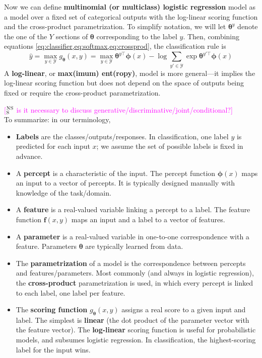 \documentclass[11pt,letterpaper]{article}
\newcommand{\ensuretext}[1]{#1}
\newcommand{\nssmarker}{\ensuretext{\textcolor{magenta}{\ensuremath{^{\textsc{NS}}_{\textsc{S}}}}}}
\newcommand{\arkcomment}[3]{\ensuretext{\textcolor{#3}{[#1 #2]}}}
\newcommand{\nss}[1]{\arkcomment{\nssmarker}{#1}{magenta}}
\newcommand{\params}{\mathbf{\theta}}
\begin{document}
Now we can define {\bf multinomial (or multiclass) logistic regression} model 
as a model over a fixed set of categorical outputs with the log-linear scoring function and the cross-product parametrization.
To simplify notation, we will let $\boldsymbol{\theta}^y$ denote the one of the $Y$ sections of $\boldsymbol{\theta}$ 
corresponding to the label $y$. 
Then, combining equations \cref{eq:classifier,eq:softmax,eq:crossprod}, 
the classification rule is
\begin{equation}\label{eq:logistic}
\hat{y} = \max_{y\in\mathcal{Y}} g_\params(x,y) = \max_{y\in\mathcal{Y}} \boldsymbol{\theta}^{y\top} \boldsymbol{\phi}(x) - \log{\sum_{y'\in\mathcal{Y}}{\exp{\boldsymbol{\theta}^{y'\top} \boldsymbol{\phi}(x)}}}
\end{equation} 
A {\bf log-linear}, or {\bf max(imum) ent(ropy)}, model is more general---it implies the log-linear scoring function 
but does not depend on the space of outputs being fixed or require the cross-product parametrization.

\nss{is it necessary to discuss generative/discriminative/joint/conditional?}
\\

\noindent To summarize: in our terminology,
\begin{itemize}
  \item {\bf Labels} are the classes/outputs/responses. In classification, one label $y$ is predicted for each input $x$; 
  we assume the set of possible labels is fixed in advance.
  \item A {\bf percept} is a characteristic of the input. The percept function $\boldsymbol{\phi}(x)$ maps an input to a vector of percepts.
  It is typically designed manually with knowledge of the task/domain.
  \item A {\bf feature} is a real-valued variable linking a percept to a label. The feature function $\mathbf{f}(x,y)$ maps an input and a label to a vector of features.
  \item A {\bf parameter} is a real-valued variable in one-to-one correspondence with a feature. Parameters $\boldsymbol{\theta}$ are typically learned from data.
  \item The {\bf parametrization} of a model is the correspondence between percepts and features/parameters. 
  Most commonly (and always in logistic regression), the {\bf cross-product} parametrization is used, in which every percept is linked to each label, one label per feature.
  \item The {\bf scoring function} $g_{\boldsymbol{\theta}}(x,y)$ assigns a real score to a given input and label. 
  The simplest is {\bf linear} (the dot product of the parameter vector with the feature vector).
  The {\bf log-linear} scoring function is useful for probabilistic models, and subsumes logistic regression.
  In classification, the highest-scoring label for the input wins. 
\end{itemize}
\end{document}
